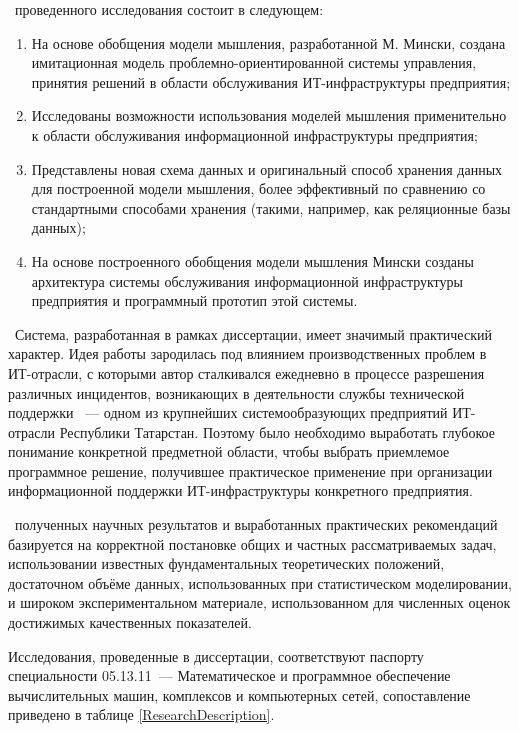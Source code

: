 \novelty\ проведенного исследования состоит в следующем:
\begin{enumerate}
  \item На основе обобщения модели мышления, разработанной М. Мински, создана имитационная модель проблемно-ориентированной системы управления, принятия решений в области обслуживания ИТ-инфраструктуры предприятия;
  \item Исследованы возможности использования моделей мышления применительно к области обслуживания информационной инфраструктуры предприятия;
  \item Представлены новая схема данных и оригинальный способ хранения данных для построенной модели мышления, более эффективный по сравнению со стандартными способами хранения (такими, например, как реляционные базы данных);
  \item На основе построенного обобщения модели мышления Мински созданы архитектура системы обслуживания информационной инфраструктуры предприятия и программный прототип этой системы.
\end{enumerate}

\influence\ 
Система, разработанная в рамках диссертации, имеет значимый практический характер. Идея работы зародилась под влиянием производственных проблем в ИТ-отрасли, с которыми автор сталкивался ежедневно в процессе разрешения различных инцидентов, возникающих в деятельности службы технической поддержки \icl~--- одном из крупнейших системообразующих предприятий ИТ-отрасли Республики Татарстан. Поэтому было необходимо выработать глубокое понимание конкретной предметной области, чтобы выбрать приемлемое программное решение, получившее практическое применение при организации информационной поддержки ИТ-инфраструктуры конкретного предприятия. \par
\reliability\ полученных научных результатов и выработанных практических рекомендаций базируется на корректной постановке общих и частных рассматриваемых задач,  использовании известных фундаментальных теоретических положений, достаточном объёме данных, использованных при статистическом моделировании, и широком экспериментальном материале, использованном для численных оценок достижимых качественных показателей. \par 
Исследования, проведенные в диссертации, соответствуют паспорту специальности 05.13.11~--- Математическое и программное обеспечение вычислительных машин, комплексов и компьютерных сетей, сопоставление приведено в таблице \ref{ResearchDescription}.


